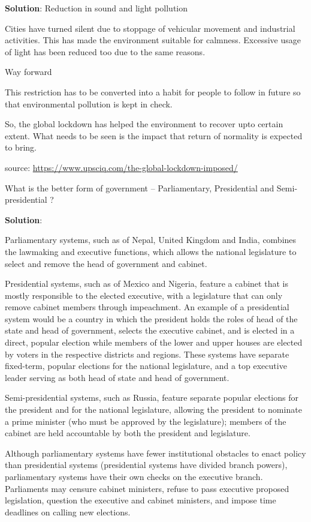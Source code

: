 \documentclass[
  openany]{book}
\newcommand{\question}{\item}
\newenvironment{solution}{ {\bfseries Solution}:}{}
\begin{document}
\begin{questions}
\begin{solution}
Reduction in sound and light pollution

Cities have turned silent due to stoppage of vehicular movement and industrial activities. This has made the environment suitable for calmness. Excessive usage of light has been reduced too due to the same reasons.

Way forward

This restriction has to be converted into a habit for people to follow in future so that environmental pollution is kept in check.

So, the global lockdown has helped the environment to recover upto certain extent. What needs to be seen is the impact that return of normality is expected to bring.

source: \url{https://www.upsciq.com/the-global-lockdown-imposed/}
\end{solution}

\question What is the better form of government -- Parliamentary, Presidential and Semi-presidential ?

\begin{solution}

Parliamentary systems, such as of Nepal, United Kingdom and India, combines the lawmaking and executive functions, which allows the national legislature to select and remove the head of government and cabinet.

Presidential systems, such as of Mexico and Nigeria, feature a cabinet that is mostly responsible to the elected executive, with a legislature that can only remove cabinet members through impeachment. An example of a presidential system would be a country in which the president holds the roles of head of the state and head of government, selects the executive cabinet, and is elected in a direct, popular election while members of the lower and upper houses are elected by voters in the respective districts and regions. These systems have separate fixed-term, popular elections for the national legislature, and a top executive leader serving as both head of state and head of government.

Semi-presidential systems, such as Russia, feature separate popular elections for the president and for the national legislature, allowing the president to nominate a prime minister (who must be approved by the legislature); members of the cabinet are held accountable by both the president and legislature.

Although parliamentary systems have fewer institutional obstacles to enact policy than presidential systems (presidential systems have divided branch powers), parliamentary systems have their own checks on the executive branch. Parliaments may censure cabinet ministers, refuse to pass executive proposed legislation, question the executive and cabinet ministers, and impose time deadlines on calling new elections.


\end{solution}
\end{questions}
\end{document}
